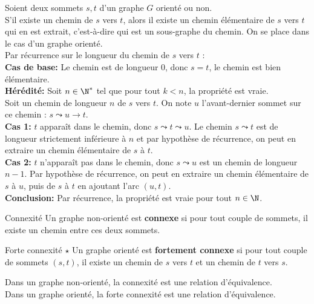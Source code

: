 \documentclass[french, 11pt]{article}
\begin{document}
\begin{prop}{}{}
    Soient deux sommets $s,t$ d'un graphe $G$ orienté ou non.\\
    S'il existe un chemin de $s$ vers $t$, alors il existe un chemin élémentaire de $s$ vers $t$ qui en est extrait, c'est-à-dire qui est un sous-graphe du chemin.
    \tcblower
    On se place dans le cas d'un graphe orienté.\\
    Par récurrence sur le longueur du chemin de $s$ vers $t$ :\\
    \textbf{Cas de base:} Le chemin est de longueur 0, donc $s=t$, le chemin est bien élémentaire.\\
    \textbf{Hérédité:} Soit $n\in\N^*$ tel que pour tout $k<n$, la propriété est vraie.\\
    Soit un chemin de longueur $n$ de $s$ vers $t$. On note $u$ l'avant-dernier sommet sur ce chemin : $s\leadsto u \to t$.\\
    \textbf{Cas 1:} $t$ apparaît dans le chemin, donc $s\leadsto t \leadsto u$. Le chemin $s\leadsto t$ est de longueur strictement inférieure à $n$ et par hypothèse de récurrence, on peut en extraire un chemin élémentaire de $s$ à $t$.\\
    \textbf{Cas 2:} $t$ n'apparaît pas dans le chemin, donc $s\leadsto u$ est un chemin de longueur $n-1$. Par hypothèse de récurrence, on peut en extraire un chemin élémentaire de $s$ à $u$, puis de $s$ à $t$ en ajoutant l'arc $(u,t)$.\\
    \textbf{Conclusion:} Par récurrence, la propriété est vraie pour tout $n\in\N$.
\end{prop}

\vspace*{-0.5cm}

\begin{defi}{Connexité}{}
    Un graphe non-orienté est \textbf{connexe} si pour tout couple de sommets, il existe un chemin entre ces deux sommets.
\end{defi}

\vspace*{-0.5cm}

\begin{defi}{Forte connexité $\star$}{}
    Un graphe orienté est \textbf{fortement connexe} si pour tout couple de sommets $(s,t)$, il existe un chemin de $s$ vers $t$ et un chemin de $t$ vers $s$.
\end{defi}

\begin{prop}{}{}
    Dans un graphe non-orienté, la connexité est une relation d'équivalence.\\
    Dans un graphe orienté, la forte connexité est une relation d'équivalence.
\end{prop}
\end{document}
